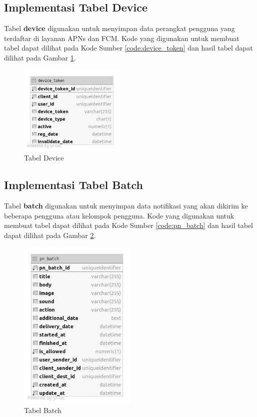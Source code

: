 \subsection{Implementasi Tabel Device}
\par Tabel \textbf{device} digunakan untuk menyimpan data perangkat pengguna yang terdaftar di layanan APNs dan FCM. Kode yang digunakan untuk membuat tabel dapat dilihat pada Kode Sumber \ref{code:device_token} dan hasil tabel dapat dilihat pada Gambar \ref{tabel_device_token}.

\begin{figure}[H]
    \centering\includegraphics[width=0.45\textwidth]{bab4/figures/tabel_device_token.jpg}
    \caption{Tabel Device}
    \label{tabel_device_token}
\end{figure}

\subsection{Implementasi Tabel Batch}
\par Tabel \textbf{batch} digunakan untuk menyimpan data notifikasi yang akan dikirim ke beberapa pengguna atau kelompok pengguna. Kode yang digunakan untuk membuat tabel dapat dilihat pada Kode Sumber \ref{code:pn_batch} dan hasil tabel dapat dilihat pada Gambar \ref{tabel_pn_batch}.

\begin{figure}[H]
    \centering\includegraphics[width=0.5\textwidth]{bab4/figures/tabel_pn_batch.jpg}
    \caption{Tabel Batch}
    \label{tabel_pn_batch}
\end{figure}

